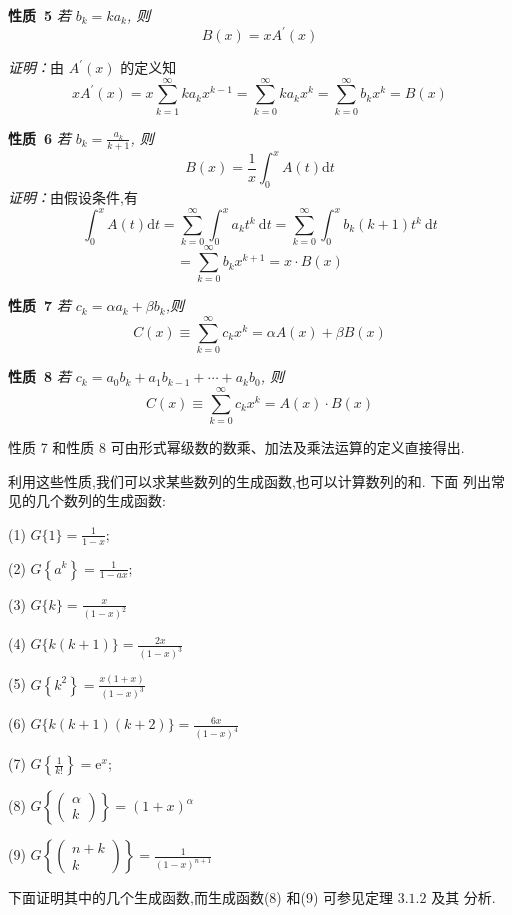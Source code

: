 \documentclass{report}
\begin{document}
\noindent
\textbf{性质\ 5} \textsl{若 $b_{k}=k a_{k}$, 则
$$
B(x)=x A^{\prime}(x)
$$}

\noindent
\textsl{证明：}由 $A^{\prime}(x)$ 的定义知
$$
x A^{\prime}(x)=x \sum_{k=1}^{\infty} k a_{k} x^{k-1}=\sum_{k=0}^{\infty} k a_{k} x^{k}=\sum_{k=0}^{\infty} b_{k} x^{k}=B(x)
$$


\noindent
\textbf{性质\ 6} \textsl{若 $b_{k}=\frac{a_{k}}{k+1}$, 则
$$
B(x)=\frac{1}{x} \int_{0}^{x} A(t) \mathrm{d} t
$$}
\textsl{证明：}由假设条件,有
$$
\int_{0}^{x} A(t) \mathrm{d} t=\sum_{k=0}^{\infty} \int_{0}^{x} a_{k} t^{k} \mathrm{~d} t=\sum_{k=0}^{\infty} \int_{0}^{x} b_{k}(k+1) t^{k} \mathrm{~d} t
$$
$$
=\sum_{k=0}^{\infty} b_{k} x^{k+1}=x \cdot B(x)
$$

\noindent
\textbf{性质\ 7} \textsl{若 $c_{k}=\alpha a_{k}+\beta b_{k}$,则
$$
C(x) \equiv \sum_{k=0}^{\infty} c_{k} x^{k}=\alpha A(x)+\beta B(x)
$$}

\noindent
\textbf{性质\ 8} \textsl{若 $c_{k}=a_{0} b_{k}+a_{1} b_{k-1}+\cdots+a_{k} b_{0}$, 则
$$
C(x) \equiv \sum_{k=0}^{\infty} c_{k} x^{k}=A(x) \cdot B(x)
$$}

性质 7 和性质 8 可由形式幂级数的数乘、加法及乘法运算的定义直接得出.

利用这些性质,我们可以求某些数列的生成函数,也可以计算数列的和. 下面 列出常见的几个数列的生成函数:

(1) $G\{1\}=\frac{1}{1-x} ;$

(2) $G\left\{a^{k}\right\}=\frac{1}{1-a x} ;$

(3) $G\{k\}=\frac{x}{(1-x)^{2}}$

(4) $G\{k(k+1)\}=\frac{2 x}{(1-x)^{3}}$

(5) $G\left\{k^{2}\right\}=\frac{x(1+x)}{(1-x)^{3}}$

(6) $G\{k(k+1)(k+2)\}=\frac{6 x}{(1-x)^{4}}$

(7) $G\left\{\frac{1}{k !}\right\}=\mathrm{e}^{x}$;

(8) $G\left\{\left(\begin{array}{l}\alpha \\ k\end{array}\right)\right\}=(1+x)^{\alpha}$

(9) $G\left\{\left(\begin{array}{c}n+k \\ k\end{array}\right)\right\}=\frac{1}{(1-x)^{n+1}}$

下面证明其中的几个生成函数,而生成函数(8) 和(9) 可参见定理 $3.1.2$ 及其 分析.
\end{document}
